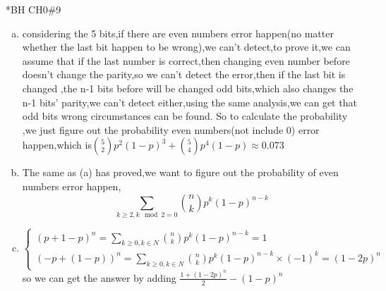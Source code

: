 \documentclass{article}
\begin{document}
\begin{homeworkProblem}*{BH CH0\#9}
\begin{enumerate}[(a)]
	\item considering the 5 bits,if there are even numbers error happen(no matter whether the last bit happen to be wrong),we can't detect,to prove it,we can assume that if the last number is correct,then changing even number before doesn't change the parity,so we can't detect the error,then if the last bit is changed ,the n-1 bits before will be changed odd bits,which also changes the n-1 bits' parity,we can't detect either,using the same analysis,we can get that odd bits wrong circumstances can be found.
	So to calculate the probability ,we just figure out the probability even numbers(not include 0) error happen,which is$\binom{5}{2}p^2(1-p)^3+\binom{5}{4}p^4(1-p)\approx 0.073$ 
\item The same as (a) has proved,we want to figure out the probability of even numbers error happen,$$
\sum\limits_{k\geq 2,k\mod{2}=0}\binom{n}{k}p^k(1-p)^{n-k}
$$
\item $
\begin{cases}(p+1-p)^n=\sum\limits_{k\geq 0,k\in N}\binom{n}{k}p^k(1-p)^{n-k}=1\\
	(-p+(1-p))^n=\sum\limits_{k\geq 0,k\in N}\binom{n}{k}p^k(1-p)^{n-k}\times(-1)^{k}=(1-2p)^n
\end{cases}$
 \\
 so we can get the answer by adding $\frac{1+(1-2p)^n}{2}-(1-p)^n$
\end{enumerate}

\end{homeworkProblem}
\end{document}
